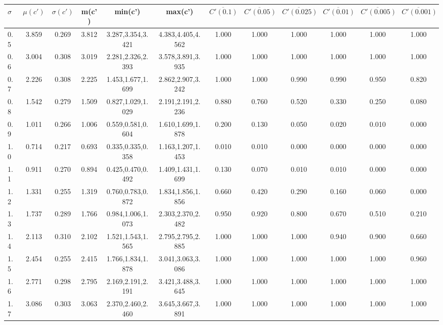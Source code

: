 \begin{table*}[h!]
\begin{center}
\begin{tabular}{| l | c | c | c | c | c | c | c | c | c | c | c |}\hline
$\sigma$ & $\mu(c')$ & $\sigma(c')$ & m(c') & min(c') & max(c') & $\overline{C'(0.1)}$ & $\overline{C'(0.05)}$ & $\overline{C'(0.025)}$ & $\overline{C'(0.01)}$ & $\overline{C'(0.005)}$ & $\overline{C'(0.001)}$ \\\hline
0.5 & 3.859 & 0.269 & 3.812 & 3.287,3.354,3.421 & 4.383,4.405,4.562  & 1.000  & 1.000  & 1.000  & 1.000  & 1.000  & 1.000 \\\hline
0.6 & 3.004 & 0.308 & 3.019 & 2.281,2.326,2.393 & 3.578,3.891,3.935  & 1.000  & 1.000  & 1.000  & 1.000  & 1.000  & 1.000 \\\hline
0.7 & 2.226 & 0.308 & 2.225 & 1.453,1.677,1.699 & 2.862,2.907,3.242  & 1.000  & 1.000  & 0.990  & 0.990  & 0.950  & 0.820 \\\hline
0.8 & 1.542 & 0.279 & 1.509 & 0.827,1.029,1.029 & 2.191,2.191,2.236  & 0.880  & 0.760  & 0.520  & 0.330  & 0.250  & 0.080 \\\hline
0.9 & 1.011 & 0.266 & 1.006 & 0.559,0.581,0.604 & 1.610,1.699,1.878  & 0.200  & 0.130  & 0.050  & 0.020  & 0.010  & 0.000 \\\hline
1.0 & 0.714 & 0.217 & 0.693 & 0.335,0.335,0.358 & 1.163,1.207,1.453  & 0.010  & 0.010  & 0.000  & 0.000  & 0.000  & 0.000 \\\hline
1.1 & 0.911 & 0.270 & 0.894 & 0.425,0.470,0.492 & 1.409,1.431,1.699  & 0.130  & 0.070  & 0.010  & 0.010  & 0.000  & 0.000 \\\hline
1.2 & 1.331 & 0.255 & 1.319 & 0.760,0.783,0.872 & 1.834,1.856,1.856  & 0.660  & 0.420  & 0.290  & 0.160  & 0.060  & 0.000 \\\hline
1.3 & 1.737 & 0.289 & 1.766 & 0.984,1.006,1.073 & 2.303,2.370,2.482  & 0.950  & 0.920  & 0.800  & 0.670  & 0.510  & 0.210 \\\hline
1.4 & 2.113 & 0.310 & 2.102 & 1.521,1.543,1.565 & 2.795,2.795,2.885  & 1.000  & 1.000  & 1.000  & 0.940  & 0.900  & 0.660 \\\hline
1.5 & 2.454 & 0.255 & 2.415 & 1.766,1.834,1.878 & 3.041,3.063,3.086  & 1.000  & 1.000  & 1.000  & 1.000  & 1.000  & 0.960 \\\hline
1.6 & 2.771 & 0.298 & 2.795 & 2.169,2.191,2.191 & 3.421,3.488,3.645  & 1.000  & 1.000  & 1.000  & 1.000  & 1.000  & 1.000 \\\hline
1.7 & 3.086 & 0.303 & 3.063 & 2.370,2.460,2.460 & 3.645,3.667,3.891  & 1.000  & 1.000  & 1.000  & 1.000  & 1.000  & 1.000 \\\hline

\end{tabular}
\end{center}
\end{table*}
